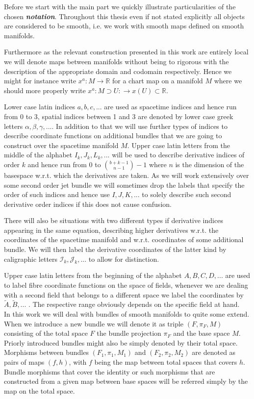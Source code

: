 \documentclass[a4paper,12pt, DIV=14, BCOR=5mm, twoside, headsepline]{scrbook}
\begin{document}
Before we start with the main part we quickly illustrate particularities of the chosen \textit{\textbf{notation}}. Throughout this thesis even if not stated explicitly all objects are considered to be smooth, i.e. we work with smooth maps defined on smooth manifolds. 

Furthermore as the relevant construction presented in this work are entirely local we will denote maps between manifolds without being to rigorous with the description of the appropriate domain and codomain respectively. Hence we might for instance write $x^a : M
\rightarrow \mathbb{R}$ for a chart map on a manifold $M$ where we should more properly write $x^a : M \supset U : \rightarrow x(U) \subset \mathbb{R} $. 

Lower case latin indices $a,b,c,...$ are used as spacetime indices and hence run from 0 to 3, spatial indices between 1 and 3 are denoted by lower case greek letters $\alpha,\beta,\gamma,...$. In addition to that we will use further types of indices to describe coordinate functions on additional bundles that we are going to construct over the spacetime manifold $M$. Upper case latin letters from the middle of the alphabet $I_k,J_k,L_k,...$ will be used to describe derivative indices of order $k$ and hence run from $0$ to $\binom{b+k-1}{n-1}-1$ where $n$ is the dimension of the basespace w.r.t. which the derivatives are taken. As we will work extensively over some second order jet bundle we will sometimes drop the labels that specify the order of such indices and hence use $I,J,K,...$ to solely describe such second derivative order indices if this does not cause confusion.

There will also be situations with two different types if derivative indices appearing in the same equation, describing higher derivatives w.r.t. the coordinates of the spacetime manifold and w.r.t. coordinates of some additional bundle. We will then label the derivative coordinates of the latter kind by caligraphic letters $\mathcal{I}_k, \mathcal{J}_k,...$ to allow for distinction.

Upper case latin letters from the beginning of the alphabet $A,B,C,D,...$ are used to label fibre coordinate functions on the space of fields, whenever we are dealing with a second field that belongs to a different space we label the coordinates by $\tilde{A}, \tilde{B},...$ . The respective range obviously depends on the specific field at hand.\\

In this work we will deal with bundles of smooth manifolds to quite some extend. When we introduce a new bundle we will denote it as triple $(F,\pi_F,M)$ consisting of the total space $F$ the bundle projection $\pi_F$ and the base space $M$. Priorly introduced bundles might also be simply denoted by their total space. Morphisms between bundles $(F_1,\pi_1,M_1)$ and $(F_2,\pi_2,M_2)$ are denoted as pairs of maps $(f,h)$, with $f$ being the map between total spaces that covers $h$. Bundle morphisms that cover the identity or such morphisms that are constructed from a given map between base spaces will be referred simply by the map on the total space.
\end{document}

